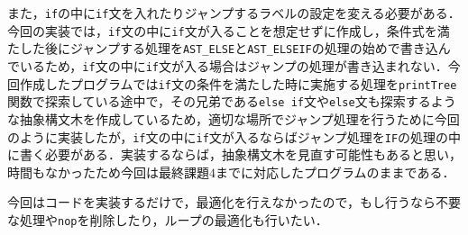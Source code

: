 \documentclass{jarticle}[11pt]
\begin{document}
また，\verb|if|の中に\verb|if|文を入れたりジャンプするラベルの設定を変える必要がある．今回の実装では，\verb|if|文の中に\verb|if|文が入ることを想定せずに作成し，条件式を満たした後にジャンプする処理を\verb|AST_ELSE|と\verb|AST_ELSEIF|の処理の始めで書き込んでいるため，\verb|if|文の中に\verb|if|文が入る場合はジャンプの処理が書き込まれない．今回作成したプログラムでは\verb|if|文の条件を満たした時に実施する処理を\verb|printTree|関数で探索している途中で，その兄弟である\verb|else if|文や\verb|else|文も探索するような抽象構文木を作成しているため，適切な場所でジャンプ処理を行うために今回のように実装したが，\verb|if|文の中に\verb|if|文が入るならばジャンプ処理を\verb|IF|の処理の中に書く必要がある．実装するならば，抽象構文木を見直す可能性もあると思い，時間もなかったため今回は最終課題$4$までに対応したプログラムのままである．

今回はコードを実装するだけで，最適化を行えなかったので，もし行うなら不要な処理や\verb|nop|を削除したり，ループの最適化も行いたい．
\end{document}
